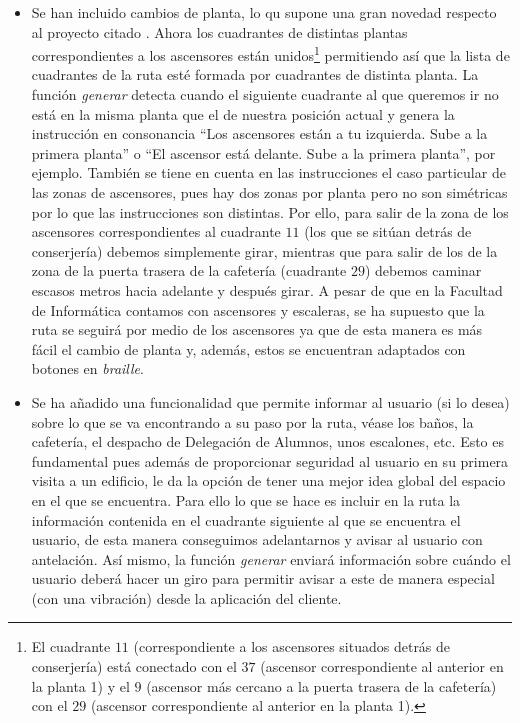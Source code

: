 \begin{itemize}
	
	\item Se han incluido cambios de planta, lo qu supone una gran novedad respecto al proyecto citado \cite{TFGguia}. Ahora los cuadrantes de distintas plantas correspondientes a los ascensores están unidos\footnote{El cuadrante $11$ (correspondiente a los ascensores situados detrás de conserjería) está conectado con el $37$ (ascensor correspondiente al anterior en la planta 1) y el $9$ (ascensor más cercano a la puerta trasera de la cafetería) con el $29$ (ascensor correspondiente al anterior en la planta 1).} permitiendo así que la lista de cuadrantes de la ruta esté formada por cuadrantes de distinta planta. La función \textit{generar} detecta cuando el siguiente cuadrante al que queremos ir no está en la misma planta que el de nuestra posición actual y genera la instrucción en consonancia ``Los ascensores están a tu izquierda. Sube a la primera planta'' o ``El ascensor está delante. Sube a la primera planta'', por ejemplo. También se tiene en cuenta en las instrucciones el caso particular de las zonas de ascensores, pues hay dos zonas por planta pero no son simétricas por lo que las instrucciones son distintas. Por ello, para salir de la zona de los ascensores correspondientes al cuadrante $11$ (los que se sitúan detrás de conserjería) debemos simplemente girar, mientras que para salir de los de la zona de la puerta trasera de la cafetería (cuadrante $29$) debemos caminar escasos metros hacia adelante y después girar. A pesar de que en la Facultad de Informática contamos con ascensores y escaleras, se ha supuesto que la ruta se seguirá por medio de los ascensores ya que de esta manera es más fácil el cambio de planta y, además, estos se encuentran adaptados con botones en \textit{braille}.
	
	\item Se ha añadido una funcionalidad que permite informar al usuario (si lo desea) sobre lo que se va encontrando a su paso por la ruta, véase los baños, la cafetería, el despacho de Delegación de Alumnos, unos escalones, etc. Esto es fundamental pues además de proporcionar seguridad al usuario en su primera visita a un edificio, le da la opción de tener una mejor idea global del espacio en el que se encuentra. Para ello lo que se hace es incluir en la ruta la información contenida en el cuadrante siguiente al que se encuentra el usuario, de esta manera conseguimos adelantarnos y avisar al usuario con antelación. Así mismo, la función \textit{generar} enviará información sobre cuándo el usuario deberá hacer un giro para permitir avisar a este de manera especial (con una vibración) desde la aplicación del cliente.
	
\end{itemize}


